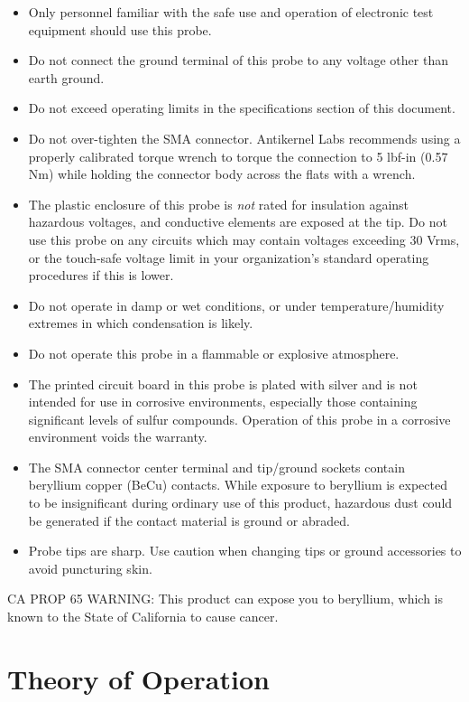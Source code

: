 \documentclass[11pt]{article}
\begin{document}
\begin{itemize}
\item Only personnel familiar with the safe use and operation of electronic test equipment should use this probe.
\item Do not connect the ground terminal of this probe to any voltage other than earth ground.
\item Do not exceed operating limits in the specifications section of this document.
\item Do not over-tighten the SMA connector. Antikernel Labs recommends using a properly calibrated torque wrench to
torque the connection to 5 lbf-in (0.57 Nm) while holding the connector body across the flats with a wrench.
\item The plastic enclosure of this probe is \emph{not} rated for insulation against hazardous voltages, and conductive
elements are exposed at the tip. Do not use this probe on any circuits which may contain voltages exceeding 30 Vrms, or
the touch-safe voltage limit in your organization's standard operating procedures if this is lower.
\item Do not operate in damp or wet conditions, or under temperature/humidity extremes in which condensation is
likely.
\item Do not operate this probe in a flammable or explosive atmosphere.
\item The printed circuit board in this probe is plated with silver and is not intended for use in corrosive environments,
especially those containing significant levels of sulfur compounds. Operation of this probe in a corrosive environment
voids the warranty.
\item  The SMA connector center terminal and tip/ground sockets contain beryllium copper (BeCu) contacts. While exposure to
beryllium is expected to be insignificant during ordinary use of this product, hazardous dust could be generated if the
contact material is ground or abraded.
\item Probe tips are sharp. Use caution when changing tips or ground accessories to avoid puncturing skin.
\end{itemize}

CA PROP 65 WARNING: This product can expose you to beryllium, which is known to the State of California to cause cancer.

\pagebreak
\section{Theory of Operation}
\end{document}
